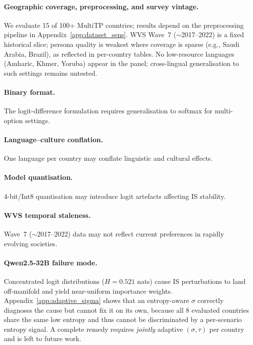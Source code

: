 \documentclass{article}
\begin{document}
\paragraph{Geographic coverage, preprocessing, and survey vintage.}
We evaluate 15 of 100+ MultiTP countries; results depend on the preprocessing
pipeline in Appendix~\ref{app:dataset_sens}.
WVS Wave~7 ($\sim$2017--2022) is a fixed historical slice; persona quality is
weakest where coverage is sparse (e.g., Saudi Arabia, Brazil), as reflected in
per-country tables.
No low-resource languages (Amharic, Khmer, Yoruba) appear in the panel;
cross-lingual generalisation to such settings remains untested.

\paragraph{Binary format.}
The logit-difference formulation requires generalisation to softmax for multi-option
settings.

\paragraph{Language--culture conflation.}
One language per country may conflate linguistic and cultural effects.

\paragraph{Model quantisation.}
4-bit/Int8 quantisation may introduce logit artefacts affecting IS stability.

\paragraph{WVS temporal staleness.}
Wave~7 ($\sim$2017--2022) data may not reflect current preferences in rapidly
evolving societies.

\paragraph{Qwen2.5-32B failure mode.}
Concentrated logit distributions ($H{=}0.521$ nats) cause IS perturbations to
land off-manifold and yield near-uniform importance weights. Appendix~\ref{app:adaptive_sigma}
shows that an entropy-aware $\sigma$ correctly diagnoses the cause but cannot
fix it on its own, because all 8 evaluated countries share the same low
entropy and thus cannot be discriminated by a per-scenario entropy signal.
A complete remedy requires \emph{jointly} adaptive $(\sigma,\tau)$ per country
and is left to future work.
\end{document}
